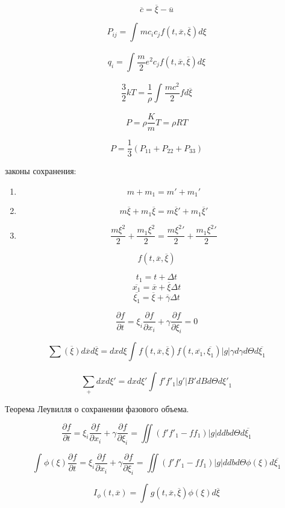 \documentclass{article}
\begin{document}
\[ \overline{c } = \overline{\xi   } - \overline{u } \] 

\[ P_{ij} = \int_{}^{} mc_i c_j f(t, \overline{x}, \overline{\xi }) d \xi   \]

\[ q_i = \int_{}^{} \frac{m }{2 } e^2 c_j f(t, \overline{x}, \overline{\xi }) d \xi   \]

\[ \frac{3}{2} k T = \frac{1}{\rho   } \int_{}^{} \frac{mc^2}{2} f d \overline{\xi   } \]

\[ P = \rho \frac{K }{m } T = \rho R T \]

\[ P = \frac{1}{3} (P_{11} + P_{22} + P_{33}) \]

законы сохранения:
\begin{enumerate}
	\item \[ m + m_1 = {m}' + {m_1}' \]
	\item \[ m \overline{\xi} + m_1 \overline{\xi} = {m \overline{\xi}}' + {m_1 \overline{\xi}}' \]
	\item \[ \frac{m \xi^2}{2} + \frac{m_1 \xi^2}{2} = \frac{{m \xi^2}'}{2} + \frac{{m_1 \xi^2}'}{2} \]
\end{enumerate}

\[ f(t, \overline{x}, \overline{\xi}) \]

\[ t_1 = t + \Delta t \]
\[ \overline{x_1} = \overline{ x} + \overline{\xi} \Delta t \]
\[ \overline{\xi_1} = \overline{\xi} + \overline{\gamma} \Delta t \]

\[ \frac{\partial f }{\partial t } = \xi_i \frac{\partial f }{\partial x_i} + \gamma \frac{\partial f }{\partial \xi_i } = 0 \]

\[ \sum_{}^{} \overline{(\xi)} d \overline{x } d \overline{\xi} = dx d\xi \int_{}^{} f(t, \overline{x }, \overline{\xi}) f(t, \overline{x_1 }, \overline{\xi_1}) |g| \gamma d \gamma d \Theta d \overline{\xi_1} \]

\[ \sum_{+}^{} dx d\xi' = dx d\xi' \int_{}^{}f' {f'}_1 |g'| B' dB d \Theta d {\xi'}_1\]

Теорема Леувилля о сохранении фазового объема.

\[ \frac{\partial f }{\partial t } = \xi_i \frac{\partial f }{\partial x_i} + \gamma \frac{\partial f }{\partial \xi_i } = \iint (f' {f'}_1 - f f_1) |g| d db d \Theta d \overline{\xi_1} \]

\[\int_{}^{} \phi(\xi ) \frac{\partial f }{\partial t } = \xi_i \frac{\partial f }{\partial x_i} + \gamma \frac{\partial f }{\partial \xi_i } = \iint (f' {f'}_1 - f f_1) |g| d db d \Theta \phi(\xi) d \overline{\xi_1} \]

\[ I_{\phi}(t, \overline{x}) = \int_{}^{} g(t, \overline{x}, \overline{\xi}) \phi(\xi) d \overline{\xi}\]
\end{document}
